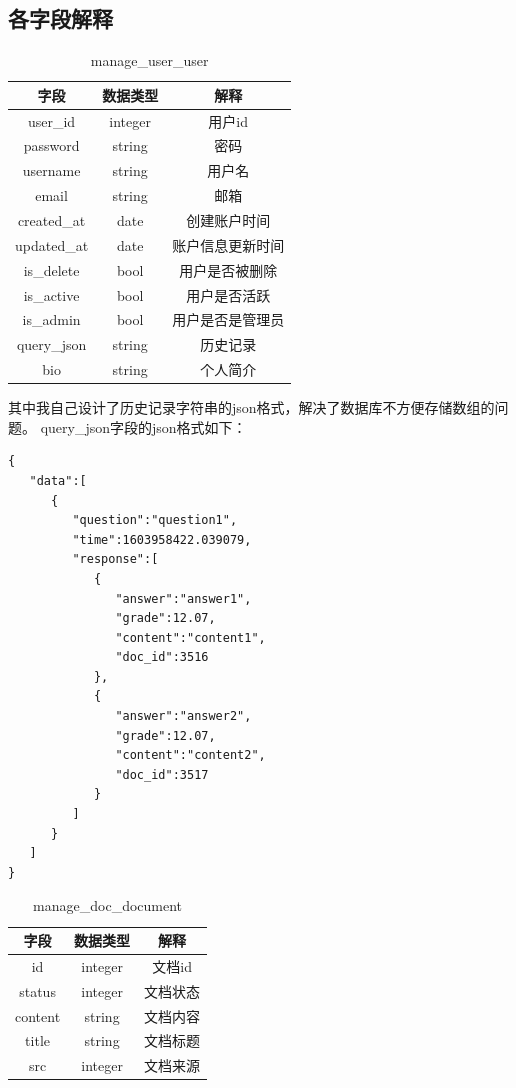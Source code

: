 \documentclass[12pt]{article}
\begin{document}
\subsection{各字段解释}
\begin{table}[h]
\caption{manage\_user\_user}
\centering
\begin{tabular}{|c|c|c|}
\hline
字段          & 数据类型    & 解释       \\ \hline
user\_id    & integer & 用户id     \\ \hline
password    & string  & 密码       \\ \hline
username    & string  & 用户名      \\ \hline
email       & string  & 邮箱       \\ \hline
created\_at & date    & 创建账户时间   \\ \hline
updated\_at & date    & 账户信息更新时间 \\ \hline
is\_delete  & bool    & 用户是否被删除  \\ \hline
is\_active  & bool    & 用户是否活跃   \\ \hline
is\_admin   & bool    & 用户是否是管理员 \\ \hline
query\_json & string  & 历史记录     \\ \hline
bio         & string  & 个人简介     \\ \hline
\end{tabular}
\end{table}
其中我自己设计了历史记录字符串的json格式，解决了数据库不方便存储数组的问题。
query\_json字段的json格式如下：
\begin{lstlisting}
{
   "data":[
      {
         "question":"question1",
         "time":1603958422.039079,
         "response":[
            {
               "answer":"answer1",
               "grade":12.07,
               "content":"content1",
               "doc_id":3516
            },
            {
               "answer":"answer2",
               "grade":12.07,
               "content":"content2",
               "doc_id":3517
            }
         ]
      }
   ]
}
\end{lstlisting}   
\begin{table}[h]
\caption{manage\_doc\_document}
\centering
\begin{tabular}{|c|c|c|}
\hline
字段      & 数据类型    & 解释   \\ \hline
id      & integer & 文档id \\ \hline
status  & integer & 文档状态 \\ \hline
content & string  & 文档内容 \\ \hline
title   & string  & 文档标题 \\ \hline
src     & integer & 文档来源 \\ \hline
\end{tabular}
\end{table}
\end{document}
